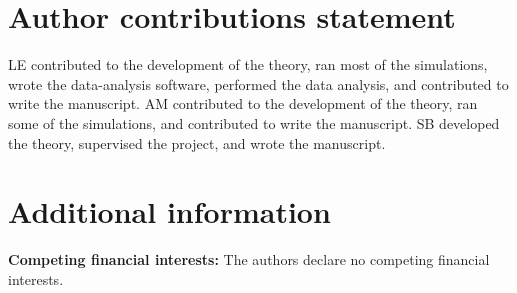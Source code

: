 \section*{Author contributions statement}
LE contributed to the development of the theory, ran most of the simulations, wrote the data-analysis software, performed the data analysis, and contributed to write the manuscript. AM contributed to the development of the theory, ran some of the simulations, and contributed to write the manuscript. SB developed the theory, supervised the project, and wrote the manuscript.

\section*{Additional information}
\textbf{Competing financial interests:}
The authors declare no competing financial interests.


